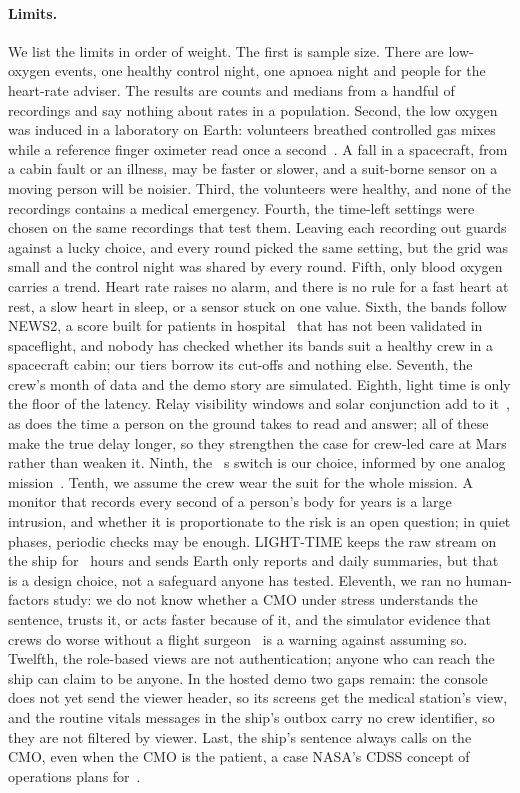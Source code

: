 \paragraph{Limits.}
We list the limits in order of weight. The first is sample size. There are \numUwEvents{} low-oxygen events, one healthy control night, one apnoea night and \numHrPeople{} people for the heart-rate adviser. The results are counts and medians from a handful of recordings and say nothing about rates in a population. Second, the low oxygen was induced in a laboratory on Earth: volunteers breathed controlled gas mixes while a reference finger oximeter read once a second~\cite{hoffman2022oximetry}. A fall in a spacecraft, from a cabin fault or an illness, may be faster or slower, and a suit-borne sensor on a moving person will be noisier. Third, the volunteers were healthy, and none of the recordings contains a medical emergency. Fourth, the time-left settings were chosen on the same \numUwEvents{} recordings that test them. Leaving each recording out guards against a lucky choice, and every round picked the same setting, but the grid was small and the control night was shared by every round. Fifth, only blood oxygen carries a trend. Heart rate raises no alarm, and there is no rule for a fast heart at rest, a slow heart in sleep, or a sensor stuck on one value. Sixth, the bands follow NEWS2, a score built for patients in hospital~\cite{rcp2017news2} that has not been validated in spaceflight, and nobody has checked whether its bands suit a healthy crew in a spacecraft cabin; our tiers borrow its cut-offs and nothing else. Seventh, the crew's month of data and the demo story are simulated. Eighth, light time is only the floor of the latency. Relay visibility windows and solar conjunction add to it~\cite{mcbrayer2022delay}, as does the time a person on the ground takes to read and answer; all of these make the true delay longer, so they strengthen the case for crew-led care at Mars rather than weaken it. Ninth, the \numCrewFirstAtS~s switch is our choice, informed by one analog mission~\cite{rader2013delay}. Tenth, we assume the crew wear the suit for the whole mission. A monitor that records every second of a person's body for years is a large intrusion, and whether it is proportionate to the risk is an open question; in quiet phases, periodic checks may be enough. LIGHT-TIME keeps the raw stream on the ship for \numRecorderHours~hours and sends Earth only reports and daily summaries, but that is a design choice, not a safeguard anyone has tested. Eleventh, we ran no human-factors study: we do not know whether a CMO under stress understands the sentence, trusts it, or acts faster because of it, and the simulator evidence that crews do worse without a flight surgeon~\cite{yule2023crew} is a warning against assuming so. Twelfth, the role-based views are not authentication; anyone who can reach the ship can claim to be anyone. In the hosted demo two gaps remain: the console does not yet send the viewer header, so its screens get the medical station's view, and the routine vitals messages in the ship's outbox carry no crew identifier, so they are not filtered by viewer. Last, the ship's sentence always calls on the CMO, even when the CMO is the patient, a case NASA's CDSS concept of operations plans for~\cite{krihak2021cdss}.

